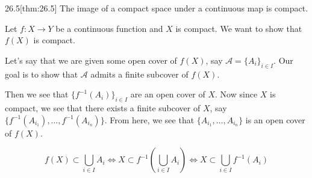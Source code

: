 \begin{thmBox}{26.5}[thm:26.5]
    The image of a compact space under a continuous map is compact.

    \baseRule

    \begin{proofBox}
        Let \( f: X \rightarrow Y \) be a continuous function and \( X \) is 
        compact.
        We want to show that \( f ( X ) \) is compact.

        \baseSkip

        Let's say that we are given some open cover of \( f ( X ) \), say 
        \( \mathcal{A} = \{ A_{ i } \}_{ i \in I } \).
        Our goal is to show that \( \mathcal{A} \) admits a finite subcover of 
        \( f ( X ) \).

        \baseSkip

        Then we see that \( \{ f^{ -1 } ( A_{ i } ) \}_{ i \in I } \) are an 
        open cover of \( X \).
        Now since \( X \) is compact, we see that there exists a finite subcover
        of \( X \), say \( \{ f^{ -1 } ( A_{ i_{ 1 } } ) , \ldots , f^{ -1 } ( A_{ i_{ n } } ) \} \).
        From here, we see that \( \{ A_{ i_{ 1 } } , \ldots , A_{ i_{ n } } \} \) is an open cover of \( f ( X ) \).

        \begin{equation*}
            f ( X ) \subset \bigcup_{ i \in I } A_{ i }
            \iff 
            X \subset f^{ -1 } \left( \bigcup_{ i \in I } A_{ i } \right)
            \iff
            X
            \subset
            \bigcup_{ i \in I } f^{ -1 } ( A_{ i } ) 
        \end{equation*}
    \end{proofBox}
\end{thmBox}

